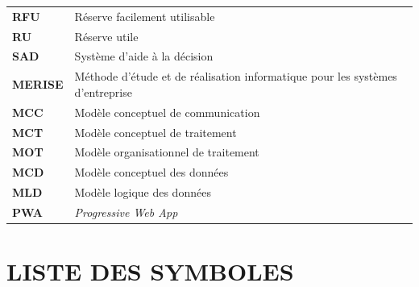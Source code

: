 \begin{longtable}{p{3.5cm}p{11cm}}
    \textbf{RFU} & Réserve facilement utilisable \\
    \textbf{RU} & Réserve utile \\
    \textbf{SAD} & Système d'aide à la décision \\
    \textbf{MERISE} & Méthode d'étude et de réalisation informatique pour les systèmes d'entreprise \\
    \textbf{MCC} & Modèle conceptuel de communication \\
    \textbf{MCT} & Modèle conceptuel de traitement \\
    \textbf{MOT} & Modèle organisationnel de traitement \\
    \textbf{MCD} & Modèle conceptuel des données \\
    \textbf{MLD} & Modèle logique des données \\
    \textbf{PWA} & \textit{Progressive Web App} \\
\end{longtable}

\chapter*{LISTE DES SYMBOLES}

